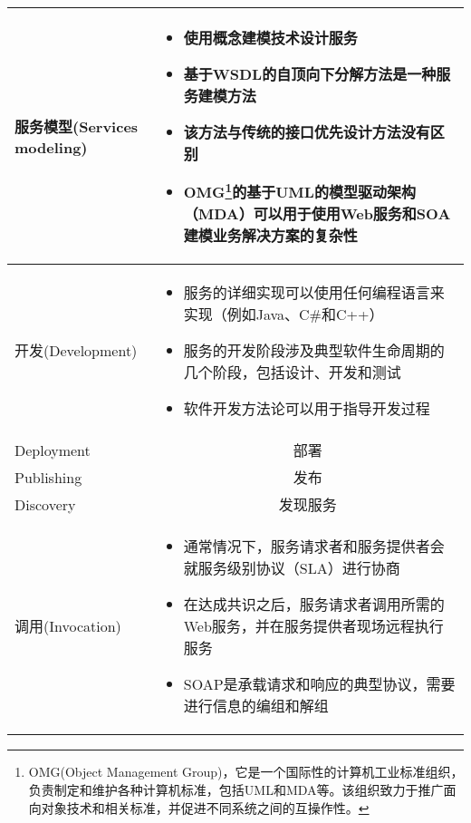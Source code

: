 \begin{longtable}{|m{2.5cm}<{\centering}|m{12cm}|}
    \hline
    服务模型(Services modeling) & 
    \vspace{-1.3em}
    \begin{itemize}[leftmargin=1.5em,itemsep=-2pt]
        \item 使用概念建模技术设计服务
        \item 基于WSDL的自顶向下分解方法是一种服务建模方法
        \item 该方法与传统的接口优先设计方法没有区别
        \item OMG\footnote{OMG(Object Management Group)，它是一个国际性的计算机工业标准组织，负责制定和维护各种计算机标准，包括UML和MDA等。该组织致力于推广面向对象技术和相关标准，并促进不同系统之间的互操作性。}的基于UML的模型驱动架构（MDA）可以用于使用Web服务和SOA建模业务解决方案的复杂性
    \vspace{-1.5em}
    \end{itemize} \\ \hline
    开发(Development) & 
    \vspace{-1.3em}
    \begin{itemize}[leftmargin=1.5em,itemsep=-2pt]
        \item 服务的详细实现可以使用任何编程语言来实现（例如Java、C\#和C++）
        \item 服务的开发阶段涉及典型软件生命周期的几个阶段，包括设计、开发和测试
        \item 软件开发方法论可以用于指导开发过程
    \vspace{-1.5em}
    \end{itemize} \\ \hline
    Deployment & \multicolumn{1}{c|}{部署}  \\ \hline
    Publishing & \multicolumn{1}{c|}{发布}  \\ \hline
    Discovery & \multicolumn{1}{c|}{发现服务}  \\ \hline
    调用(Invocation) & 
    \vspace{-1.3em}
    \begin{itemize}[leftmargin=1.5em,itemsep=-2pt]
        \item 通常情况下，服务请求者和服务提供者会就服务级别协议（SLA）进行协商
        \item 在达成共识之后，服务请求者调用所需的Web服务，并在服务提供者现场远程执行服务
        \item SOAP是承载请求和响应的典型协议，需要进行信息的编组和解组
    \vspace{-1.5em}

\end{itemize}
\end{longtable}
